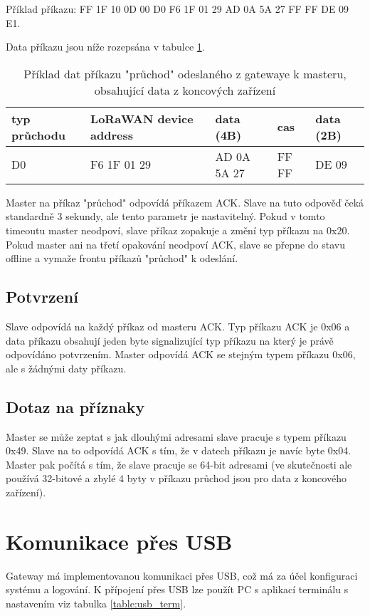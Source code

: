 Příklad příkazu: FF 1F 10 0D 00 D0 F6 1F 01 29 AD 0A 5A 27 FF FF DE 09 E1.

Data příkazu jsou níže rozepsána v tabulce \ref{table:prikladprikazpruchod}.

\begin{table}[!h]
    \centering
\begin{tabular}{ | p{1.5cm} | p{3cm} | p{2.5cm} | p{1.3cm} | p{1.3cm} |  }
 \hline
 typ průchodu & LoRaWAN device address & data (4B)     & cas   & data (2B) \\ \hline
 D0           & F6 1F 01 29            &  AD 0A 5A 27  & FF FF & DE 09     \\ 
 \hline
\end{tabular}
    \caption{Příklad dat příkazu "průchod" odeslaného z gatewaye k masteru, obsahující data z koncových zařízení}
    \label{table:prikladprikazpruchod}
\end{table}

Master na příkaz "průchod" odpovídá příkazem ACK. Slave na tuto odpověď čeká standardně 3 sekundy, ale tento parametr je nastavitelný. Pokud v tomto timeoutu master neodpoví, slave  příkaz zopakuje a změní typ příkazu na 0x20. Pokud master ani na třetí opakování neodpoví ACK, slave se přepne do stavu offline a vymaže frontu příkazů "průchod" k odeslání.

\subsection{Potvrzení}
Slave odpovídá na každý příkaz od masteru ACK. Typ příkazu ACK je 0x06 a data příkazu obsahují jeden byte signalizující typ příkazu na který je právě odpovídáno potvrzením.
Master odpovídá ACK se stejným typem příkazu 0x06, ale s žádnými daty příkazu.

\subsection{Dotaz na příznaky}
Master se může zeptat s jak dlouhými adresami slave pracuje s typem příkazu 0x49. Slave na to odpovídá ACK s tím, že v datech příkazu je navíc byte 0x04. Master pak počítá s tím, že slave pracuje se 64-bit adresami (ve skutečnosti ale používá 32-bitové a zbylé 4 byty v příkazu průchod jsou pro data z koncového zařízení).

\section{Komunikace přes USB}
Gateway má implementovanou komunikaci přes USB, což má za účel konfiguraci systému a logování. K přípojení přes USB lze použít PC s  aplikací terminálu s nastavením viz tabulka \ref{table:usb_term}.

